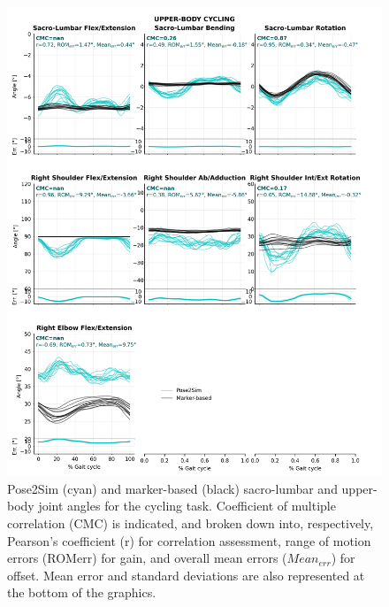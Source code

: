 \begin{figure}[!ht]
	\centering
	\def\svgwidth{1\columnwidth}
	\fontsize{10pt}{10pt}\selectfont
	\includegraphics[height=\dimexpr\textheight-119pt]{"../Annexes/Figures/Fig_QTMBikeUp.png"}
	\caption{Pose2Sim (cyan) and marker-based (black) sacro-lumbar and upper-body joint angles for the cycling task. Coefficient of multiple correlation (CMC) is indicated, and broken down into, respectively, Pearson’s coefficient (r) for correlation assessment, range of motion errors (ROMerr) for gain, and overall mean errors (\(Mean_{err}\)) for offset. Mean error and standard deviations are also represented at the bottom of the graphics.}
	\label{fig_qtmbikeup}
\end{figure}


